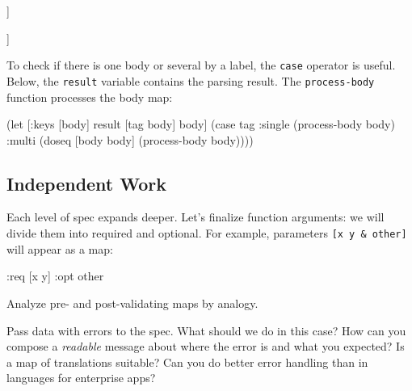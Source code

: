 \ifx\DEVICETYPE\MOBILE

\begin{english}
  \begin{clojure}
[:multi [{:args [x]
          :code [(println 1)]}
         {:args [x y]
          :code [(println 2)]}]]
  \end{clojure}
\end{english}

\else

\begin{english}
  \begin{clojure}
[:multi [{:args [x] :code [(println 1)]}
         {:args [x y] :code [(println 2)]}]]
  \end{clojure}
\end{english}

\fi

To check if there is one body or several by a label, the \verb|case| operator is useful. Below, the \verb|result| variable contains the parsing result. The \verb|process-body| function processes the body map:

\begin{english}
  \begin{clojure}
(let [{:keys [body]} result
      [tag body] body]
  (case tag
    :single
    (process-body body)
    :multi
    (doseq [body body]
      (process-body body))))
  \end{clojure}
\end{english}

\subsection{Independent Work}


Each level of spec expands deeper. Let's finalize function arguments: we will divide them into required and optional. For example, parameters \verb|[x y & other]| will appear as a map:

\begin{english}
  \begin{clojure}
{:req [x y] :opt other}
  \end{clojure}
\end{english}

\noindent
Analyze pre- and post-validating maps by analogy.

Pass data with errors to the spec. What should we do in this case? How can you compose a \emph{readable} message about where the error is and what you expected? Is a map of translations suitable? Can you do better error handling than in languages for enterprise apps?

